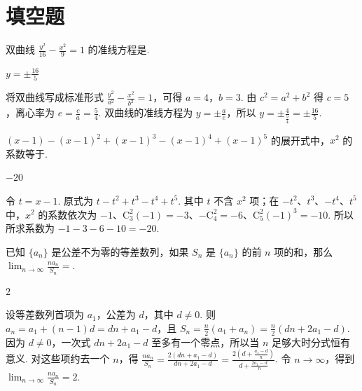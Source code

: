\documentclass[UTF8,a4paper,oneside,11pt]{ctexbook}
\begin{document}
\section{填空题}

\begin{problem}
双曲线 \(\frac{y^2}{16}-\frac{x^2}{9}=1\) 的准线方程是\fillinblank{}.
\end{problem}

\begin{answer}
\(y=\pm\frac{16}{5}\)
\end{answer}

\begin{solution}
将双曲线写成标准形式 \(\frac{y^2}{a^2}-\frac{x^2}{b^2}=1\)，可得 \(a=4\)，\(b=3\). 由 \(c^2=a^2+b^2\) 得 \(c=5\)，离心率为 \(e=\frac{c}{a}=\frac{5}{4}\). 双曲线的准线方程为 \(y=\pm\frac{a}{e}\)，所以 \(y=\pm\frac{4}{\frac{5}{4}}=\pm\frac{16}{5}\).
\end{solution}

\begin{problem}
\((x-1)-(x-1)^2+(x-1)^3-(x-1)^4+(x-1)^5\) 的展开式中，\(x^2\) 的系数等于\fillinblank{}.
\end{problem}

\begin{answer}
\(-20\)
\end{answer}

\begin{solution}
令 \(t=x-1\). 原式为 \(t-t^2+t^3-t^4+t^5\). 其中 \(t\) 不含 \(x^2\) 项；在 \(-t^2\)、\(t^3\)、\(-t^4\)、\(t^5\) 中，\(x^2\) 的系数依次为 \(-1\)、\(\mathrm C_3^2(-1)=-3\)、\(-\mathrm C_4^2=-6\)、\(\mathrm C_5^2(-1)^3=-10\). 所以所求系数为 \(-1-3-6-10=-20\).
\end{solution}

\begin{problem}
已知 \(\{a_n\}\) 是公差不为零的等差数列，如果 \(S_n\) 是 \(\{a_n\}\) 的前 \(n\) 项的和，那么 \(\displaystyle\lim_{n\to\infty}\frac{na_n}{S_n}=\)\fillinblank{}.
\end{problem}

\begin{answer}
\(2\)
\end{answer}

\begin{solution}
设等差数列首项为 \(a_1\)，公差为 \(d\)，其中 \(d\neq0\). 则 \(a_n=a_1+(n-1)d=dn+a_1-d\)，且 \(S_n=\frac{n}{2}(a_1+a_n)=\frac{n}{2}(dn+2a_1-d)\). 因为 \(d\neq0\)，一次式 \(dn+2a_1-d\) 至多有一个零点，所以当 \(n\) 足够大时分式恒有意义. 对这些项约去一个 \(n\)，得 \(\frac{na_n}{S_n}=\frac{2(dn+a_1-d)}{dn+2a_1-d}=\frac{2\left(d+\frac{a_1-d}{n}\right)}{d+\frac{2a_1-d}{n}}\). 令 \(n\to\infty\)，得到 \(\displaystyle\lim_{n\to\infty}\frac{na_n}{S_n}=2\).
\end{solution}
\end{document}
